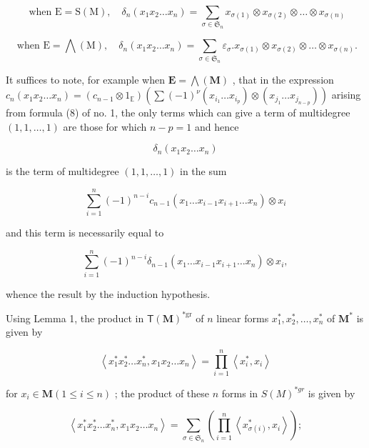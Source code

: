 \[
\text { when } \mathrm{E} = \mathrm{S(M)}, \quad \delta_ {n} (x _ {1} x _ {2} \dots x _ {n}) = \sum_ {\sigma \in \mathfrak {S} _ {n}} x _ {\sigma (1)} \otimes x _ {\sigma (2)} \otimes \dots \otimes x _ {\sigma (n)}
\]

\[
\text { when } \mathrm{E} = \bigwedge (\mathrm{M}), \quad \delta_ {n} (x _ {1} x _ {2} \dots x _ {n}) = \sum_ {\sigma \in \mathfrak {S} _ {n}} \varepsilon_ {\sigma}. x _ {\sigma (1)} \otimes x _ {\sigma (2)} \otimes \dots \otimes x _ {\sigma (n)}.
\]

It suffices to note, for example when \(\mathbf{E} = \bigwedge (\mathbf{M})\) , that in the expression \(c_{n}(x_{1}x_{2}\ldots x_{n}) = (c_{n - 1}\otimes 1_{\mathbb{E}})\left(\sum (-1)^{\nu}(x_{i_1}\ldots x_{i_p})\otimes (x_{j_1}\ldots x_{j_{n - p}})\right)\) arising from formula (8) of no. 1, the only terms which can give a term of multidegree \((1,1,\dots ,1)\) are those for which \(n - p = 1\) and hence

\[
\delta_ {n} (x _ {1} x _ {2} \dots x _ {n})
\]

is the term of multidegree \((1, 1, \ldots, 1)\) in the sum

\[
\sum_ {i = 1} ^ {n} (- 1) ^ {n - i} c _ {n - 1} \left(x _ {1} \dots x _ {i - 1} x _ {i + 1} \dots x _ {n}\right) \otimes x _ {i}
\]

and this term is necessarily equal to

\[
\sum_ {i = 1} ^ {n} (- 1) ^ {n - i} \delta_ {n - 1} (x _ {1} \dots x _ {i - 1} x _ {i + 1} \dots x _ {n}) \otimes x _ {i},
\]

whence the result by the induction hypothesis.

Using Lemma 1, the product in \(\mathsf{T}(\mathbf{M})^{*\mathrm{gr}}\) of \(n\) linear forms \(x_{1}^{*}, x_{2}^{*}, \ldots, x_{n}^{*}\) of \(\mathbf{M}^{*}\) is given by

\[
\left\langle x _ {1} ^ {*} x _ {2} ^ {*} \dots x _ {n} ^ {*}, x _ {1} x _ {2} \dots x _ {n} \right\rangle = \prod_ {i = 1} ^ {n} \left\langle x _ {i} ^ {*}, x _ {i} \right\rangle\tag{28}
\]

for \(x_{i} \in \mathbf{M} (1 \leqslant i \leqslant n)\) ; the product of these \(n\) forms in \(S(M)^{*gr}\) is given by

\[
\left\langle x _ {1} ^ {*} x _ {2} ^ {*} \dots x _ {n} ^ {*}, x _ {1} x _ {2} \dots x _ {n} \right\rangle = \sum_ {\sigma \in \mathfrak {S} _ {n}} \left(\prod_ {i = 1} ^ {n} \left\langle x _ {\sigma (i)} ^ {*}, x _ {i} \right\rangle\right);\tag{29}
\]

